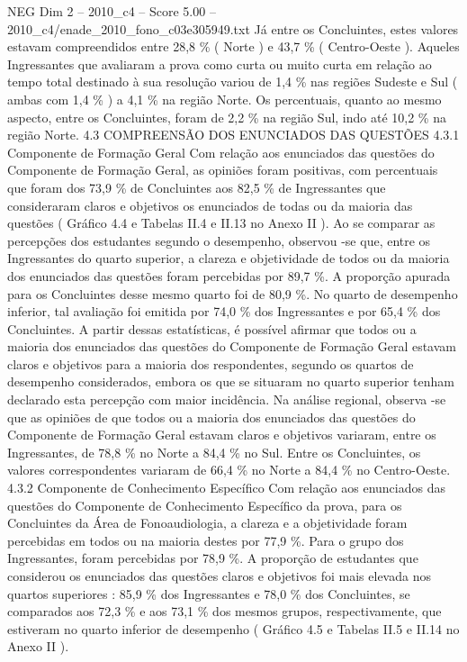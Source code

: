\begin{textsample}{NEG Dim 2 – 2010\_c4 – Score 5.00 – 2010\_c4/enade\_2010\_fono\_c03e305949.txt}
Já entre os Concluintes, estes valores estavam compreendidos entre 28,8 \% ( Norte ) e 43,7 \% ( Centro-Oeste ).
Aqueles Ingressantes que avaliaram a prova como curta ou muito curta em relação ao tempo total destinado à sua resolução variou de 1,4 \% nas regiões Sudeste e Sul ( ambas com 1,4 \% ) a 4,1 \% na região Norte.
Os percentuais, quanto ao mesmo aspecto, entre os Concluintes, foram de 2,2 \% na região Sul, indo até 10,2 \% na região Norte. 4.3 COMPREENSÃO DOS ENUNCIADOS DAS QUESTÕES 4.3.1 Componente de Formação Geral Com relação aos enunciados das questões do Componente de Formação Geral, as opiniões foram positivas, com percentuais que foram dos 73,9 \% de Concluintes aos 82,5 \% de Ingressantes que consideraram claros e objetivos os enunciados de todas ou da maioria das questões ( Gráfico 4.4 e Tabelas II.4 e II.13 no Anexo II ).
Ao se comparar as percepções dos estudantes segundo o desempenho, observou -se que, entre os Ingressantes do quarto superior, a clareza e objetividade de todos ou da maioria dos enunciados das questões foram percebidas por 89,7 \%.
A proporção apurada para os Concluintes desse mesmo quarto foi de 80,9 \%.
No quarto de desempenho inferior, tal avaliação foi emitida por 74,0 \% dos Ingressantes e por 65,4 \% dos Concluintes.
A partir dessas estatísticas, é possível afirmar que todos ou a maioria dos enunciados das questões do Componente de Formação Geral estavam claros e objetivos para a maioria dos respondentes, segundo os quartos de desempenho considerados, embora os que se situaram no quarto superior tenham declarado esta percepção com maior incidência.
Na análise regional, observa -se que as opiniões de que todos ou a maioria dos enunciados das questões do Componente de Formação Geral estavam claros e objetivos variaram, entre os Ingressantes, de 78,8 \% no Norte a 84,4 \% no Sul.
Entre os Concluintes, os valores correspondentes variaram de 66,4 \% no Norte a 84,4 \% no Centro-Oeste. 4.3.2 Componente de Conhecimento Específico Com relação aos enunciados das questões do Componente de Conhecimento Específico da prova, para os Concluintes da Área de Fonoaudiologia, a clareza e a objetividade foram percebidas em todos ou na maioria destes por 77,9 \%.
Para o grupo dos Ingressantes, foram percebidas por 78,9 \%.
A proporção de estudantes que considerou os enunciados das questões claros e objetivos foi mais elevada nos quartos superiores : 85,9 \% dos Ingressantes e 78,0 \% dos Concluintes, se comparados aos 72,3 \% e aos 73,1 \% dos mesmos grupos, respectivamente, que estiveram no quarto inferior de desempenho ( Gráfico 4.5 e Tabelas II.5 e II.14 no Anexo II ).

\end{textsample}
